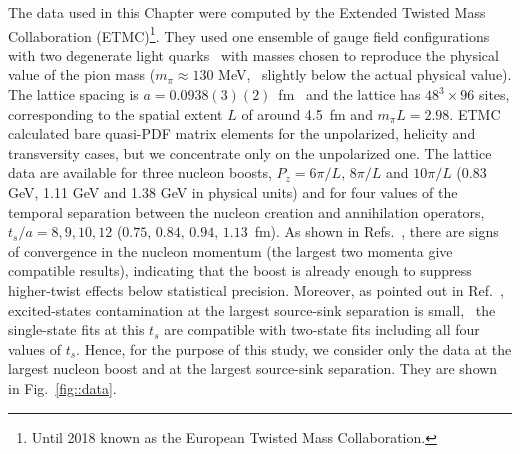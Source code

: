 The data used in this Chapter were computed by the Extended Twisted Mass Collaboration
(ETMC)\footnote{Until 2018 known as the European Twisted Mass Collaboration.}.
They used one ensemble of gauge field configurations with two degenerate light
quarks~\cite{Abdel-Rehim:2015pwa} with masses chosen to reproduce the physical
value of the pion mass ($m_\pi\approx130$ MeV, \ie\ slightly below the actual
physical value). The lattice spacing is $a=0.0938(3)(2)$~fm~\cite{Alexandrou:2017xwd} and the lattice has
$48^3 \times 96$ sites, corresponding to the spatial extent $L$ of around 4.5~fm
and $m_\pi L = 2.98$. ETMC calculated bare quasi-PDF matrix elements for the
unpolarized, helicity and transversity cases, but we concentrate only on the
unpolarized one. The lattice data are available for three nucleon boosts,
$P_z=6\pi/L,\,8\pi/L$ and $10\pi/L$ (0.83 GeV, 1.11 GeV and 1.38 GeV in physical
units) and for four values of the temporal separation between the nucleon
creation and annihilation operators, $t_s/a{=}8,9,10,12$ ($0.75,\, 0.84,\,
0.94,\, 1.13$~fm). As shown in Refs.~\cite{Alexandrou:2018pbm,Alexandrou:2019lfo}, there are signs
of convergence in the nucleon momentum (the largest two momenta give compatible
results), indicating that the boost is already enough to suppress higher-twist
effects below statistical precision. Moreover, as pointed out in
Ref.~\cite{Alexandrou:2019lfo}, excited-states contamination at the largest
source-sink separation is small, \ie\ the single-state fits at this $t_s$ are
compatible with two-state fits including all four values of $t_s$. Hence, for
the purpose of this study, we consider only the data at the largest nucleon
boost and at the largest source-sink separation. 
They are shown in Fig.~\ref{fig::data}.

